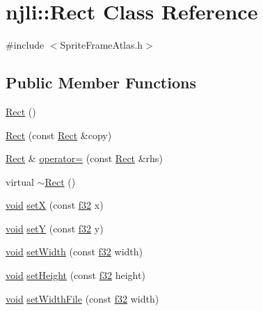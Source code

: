 \hypertarget{classnjli_1_1_rect}{}\section{njli\+:\+:Rect Class Reference}
\label{classnjli_1_1_rect}


{\ttfamily \#include $<$Sprite\+Frame\+Atlas.\+h$>$}

\subsection*{Public Member Functions}
\begin{DoxyCompactItemize}
\item 
\mbox{\hyperlink{classnjli_1_1_rect_a2c25e6a42c5f9e1b65817767a1623551}{Rect}} ()
\item 
\mbox{\hyperlink{classnjli_1_1_rect_a243933a940eb2dbb7ec885983298a909}{Rect}} (const \mbox{\hyperlink{classnjli_1_1_rect}{Rect}} \&copy)
\item 
\mbox{\hyperlink{classnjli_1_1_rect}{Rect}} \& \mbox{\hyperlink{classnjli_1_1_rect_a7314f91fde16f316d58f65cf6fc7b15a}{operator=}} (const \mbox{\hyperlink{classnjli_1_1_rect}{Rect}} \&rhs)
\item 
virtual \mbox{\hyperlink{classnjli_1_1_rect_a5bf75eebecf25e183d78b9bc2efe1b00}{$\sim$\+Rect}} ()
\item 
\mbox{\hyperlink{_thread_8h_af1e856da2e658414cb2456cb6f7ebc66}{void}} \mbox{\hyperlink{classnjli_1_1_rect_a25efd75622840e4ed4c82f8f8a1e17c3}{setX}} (const \mbox{\hyperlink{_util_8h_a5f6906312a689f27d70e9d086649d3fd}{f32}} x)
\item 
\mbox{\hyperlink{_thread_8h_af1e856da2e658414cb2456cb6f7ebc66}{void}} \mbox{\hyperlink{classnjli_1_1_rect_a5606d634e931e9f9c933a5f51f128f9c}{setY}} (const \mbox{\hyperlink{_util_8h_a5f6906312a689f27d70e9d086649d3fd}{f32}} y)
\item 
\mbox{\hyperlink{_thread_8h_af1e856da2e658414cb2456cb6f7ebc66}{void}} \mbox{\hyperlink{classnjli_1_1_rect_a4d2d37a28ab1395b9fa4c1074736b7a1}{set\+Width}} (const \mbox{\hyperlink{_util_8h_a5f6906312a689f27d70e9d086649d3fd}{f32}} width)
\item 
\mbox{\hyperlink{_thread_8h_af1e856da2e658414cb2456cb6f7ebc66}{void}} \mbox{\hyperlink{classnjli_1_1_rect_a0f649ffe61c054d305651b14e6239a9e}{set\+Height}} (const \mbox{\hyperlink{_util_8h_a5f6906312a689f27d70e9d086649d3fd}{f32}} height)
\item 
\mbox{\hyperlink{_thread_8h_af1e856da2e658414cb2456cb6f7ebc66}{void}} \mbox{\hyperlink{classnjli_1_1_rect_a793503fbc0a2568486dafe8da98c0304}{set\+Width\+File}} (const \mbox{\hyperlink{_util_8h_a5f6906312a689f27d70e9d086649d3fd}{f32}} width)

\end{DoxyCompactItemize}
